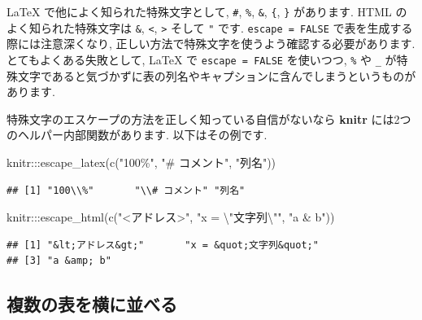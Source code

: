 \documentclass[
  11pt,
]{bxjsreport}
\newenvironment{Shaded}{\begin{snugshade}}{\end{snugshade}}
\newcommand{\FunctionTok}[1]{\textcolor[rgb]{0.00,0.00,0.00}{#1}}
\newcommand{\NormalTok}[1]{#1}
\newcommand{\SpecialCharTok}[1]{\textcolor[rgb]{0.00,0.00,0.00}{#1}}
\newcommand{\StringTok}[1]{\textcolor[rgb]{0.31,0.60,0.02}{#1}}
\begin{document}
LaTeX で他によく知られた特殊文字として, \texttt{\#}, \texttt{\%}, \texttt{\&}, \texttt{\{}, \texttt{\}} があります. HTML のよく知られた特殊文字は \texttt{\&}, \texttt{\textless{}}, \texttt{\textgreater{}} そして \texttt{"} です. \texttt{escape = FALSE} で表を生成する際には注意深くなり, 正しい方法で特殊文字を使うよう確認する必要があります. とてもよくある失敗として, LaTeX で \texttt{escape = FALSE} を使いつつ, \texttt{\%} や \texttt{\_} が特殊文字であると気づかずに表の列名やキャプションに含んでしまうというものがあります.

特殊文字のエスケープの方法を正しく知っている自信がないなら \textbf{knitr} には2つのヘルパー内部関数があります. 以下はその例です.

\begin{Shaded}
\begin{Highlighting}[numbers=left,,]
\NormalTok{knitr}\SpecialCharTok{:::}\FunctionTok{escape\_latex}\NormalTok{(}\FunctionTok{c}\NormalTok{(}\StringTok{"100\%"}\NormalTok{, }\StringTok{"\# コメント"}\NormalTok{, }\StringTok{"列名"}\NormalTok{))}
\end{Highlighting}
\end{Shaded}

\begin{verbatim}
## [1] "100\\%"       "\\# コメント" "列名"
\end{verbatim}

\begin{Shaded}
\begin{Highlighting}[numbers=left,,]
\NormalTok{knitr}\SpecialCharTok{:::}\FunctionTok{escape\_html}\NormalTok{(}\FunctionTok{c}\NormalTok{(}\StringTok{"\textless{}アドレス\textgreater{}"}\NormalTok{, }\StringTok{"x = }\SpecialCharTok{\textbackslash{}"}\StringTok{文字列}\SpecialCharTok{\textbackslash{}"}\StringTok{"}\NormalTok{, }
  \StringTok{"a \& b"}\NormalTok{))}
\end{Highlighting}
\end{Shaded}

\begin{verbatim}
## [1] "&lt;アドレス&gt;"       "x = &quot;文字列&quot;"
## [3] "a &amp; b"
\end{verbatim}

\hypertarget{multiple-tables-siede-by-side}{%
\subsection{複数の表を横に並べる}\label{multiple-tables-siede-by-side}}
\end{document}

